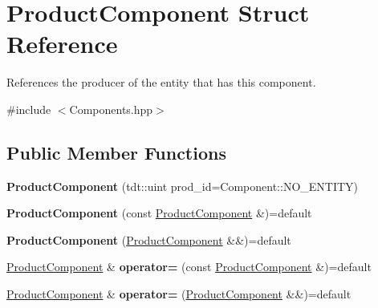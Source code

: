 \hypertarget{struct_product_component}{}\section{Product\+Component Struct Reference}
\label{struct_product_component}


References the producer of the entity that has this component.  




{\ttfamily \#include $<$Components.\+hpp$>$}

\subsection*{Public Member Functions}
\begin{DoxyCompactItemize}
\item 
{\bfseries Product\+Component} (tdt\+::uint prod\+\_\+id=Component\+::\+N\+O\+\_\+\+E\+N\+T\+I\+TY)\hypertarget{struct_product_component_ab40e40098680fa386f66bae4c175fbfb}{}\label{struct_product_component_ab40e40098680fa386f66bae4c175fbfb}

\item 
{\bfseries Product\+Component} (const \hyperlink{struct_product_component}{Product\+Component} \&)=default\hypertarget{struct_product_component_afd6dffca5d8adeff03db3f2cea9c24ee}{}\label{struct_product_component_afd6dffca5d8adeff03db3f2cea9c24ee}

\item 
{\bfseries Product\+Component} (\hyperlink{struct_product_component}{Product\+Component} \&\&)=default\hypertarget{struct_product_component_a56da8b4c79e4cd859ccc666955f0dcbc}{}\label{struct_product_component_a56da8b4c79e4cd859ccc666955f0dcbc}

\item 
\hyperlink{struct_product_component}{Product\+Component} \& {\bfseries operator=} (const \hyperlink{struct_product_component}{Product\+Component} \&)=default\hypertarget{struct_product_component_a9d1580b127ad15f2a65d8e96d1b533c1}{}\label{struct_product_component_a9d1580b127ad15f2a65d8e96d1b533c1}

\item 
\hyperlink{struct_product_component}{Product\+Component} \& {\bfseries operator=} (\hyperlink{struct_product_component}{Product\+Component} \&\&)=default\hypertarget{struct_product_component_a23c4ad5316f90f831a15ec2a088c8cb3}{}\label{struct_product_component_a23c4ad5316f90f831a15ec2a088c8cb3}

\end{DoxyCompactItemize}
